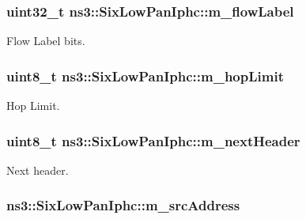 \subsubsection[{\texorpdfstring{m\+\_\+flow\+Label}{m_flowLabel}}]{\setlength{\rightskip}{0pt plus 5cm}uint32\+\_\+t ns3\+::\+Six\+Low\+Pan\+Iphc\+::m\+\_\+flow\+Label\hspace{0.3cm}{\ttfamily [private]}}\hypertarget{classns3_1_1SixLowPanIphc_af9e6e3991d8b77caf1349088021833ce}{}\label{classns3_1_1SixLowPanIphc_af9e6e3991d8b77caf1349088021833ce}


Flow Label bits. 

\subsubsection[{\texorpdfstring{m\+\_\+hop\+Limit}{m_hopLimit}}]{\setlength{\rightskip}{0pt plus 5cm}uint8\+\_\+t ns3\+::\+Six\+Low\+Pan\+Iphc\+::m\+\_\+hop\+Limit\hspace{0.3cm}{\ttfamily [private]}}\hypertarget{classns3_1_1SixLowPanIphc_a532347e6c681f0a361fddc05ef3fef84}{}\label{classns3_1_1SixLowPanIphc_a532347e6c681f0a361fddc05ef3fef84}


Hop Limit. 

\subsubsection[{\texorpdfstring{m\+\_\+next\+Header}{m_nextHeader}}]{\setlength{\rightskip}{0pt plus 5cm}uint8\+\_\+t ns3\+::\+Six\+Low\+Pan\+Iphc\+::m\+\_\+next\+Header\hspace{0.3cm}{\ttfamily [private]}}\hypertarget{classns3_1_1SixLowPanIphc_ae17f4c6ba6d27ec812c7d8ae441c60bd}{}\label{classns3_1_1SixLowPanIphc_ae17f4c6ba6d27ec812c7d8ae441c60bd}


Next header. 

\subsubsection[{\texorpdfstring{m\+\_\+src\+Address}{m_srcAddress}}]{ ns3\+::\+Six\+Low\+Pan\+Iphc\+::m\+\_\+src\+Address\hspace{0.3cm}{\ttfamily [private]}}\hypertarget{classns3_1_1SixLowPanIphc_a12eecec35a5a9a549fd7fc785b65df59}{}\label{classns3_1_1SixLowPanIphc_a12eecec35a5a9a549fd7fc785b65df59}


